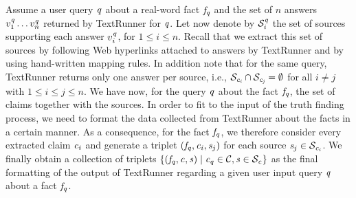 Assume a user query $\mathit{q}$ about a real-word fact $\mathit{f}_{\mathit{q}}$ and the set of $n$ answers $v_1^{\mathit{q}}\ldots v_n^{\mathit{q}}$
returned by TextRunner for $\mathit{q}$. Let now denote by $\mathcal{S}_{i}^{\mathit{q}}$ the set of sources supporting each answer $v_i^{\mathit{q}}$,
for $1\leq i\leq n$. Recall that we extract this set of sources by following Web hyperlinks attached to answers by TextRunner and by 
using hand-written mapping rules. In addition note that for the same query, TextRunner returns only one answer per source, i.e., $\mathcal{S}_{\mathit{c_{i}}}
\cap \mathcal{S}_{\mathit{c_{j}}}=\emptyset$ for all $i\neq j$ with $1\leq i\leq j\leq n$. We have now, for the query
$\mathit{q}$ about the fact $\mathit{f}_{\mathit{q}}$, the set of claims together with the sources. In order to fit to 
the input of the truth finding process, we need to format the data collected from TextRunner about the 
facts in a certain manner. As a consequence, for the fact $\mathit{f}_{\mathit{q}}$, we therefore consider every extracted 
claim $\mathit{c_{i}}$ and generate a triplet $(\mathit{f}_{\mathit{q}}, \mathit{c_{i}}, \mathit{s}_{j})$ for each source $\mathit{s}_{j}\in \mathcal{S}_{\mathit{c_{i}}}$.
We finally obtain a collection of triplets $\{(\mathit{f}_{\mathit{q}}, \mathit{c_{}}, \mathit{s}_{})\mid \mathit{c_{\mathit{q}}}\in \mathcal{C}, \mathit{s}_{} \in \mathcal{S}_{\mathit{c_{}}}\}$ 
as the final formatting of the output of TextRunner regarding a given user input query $\mathit{q}$ about a fact $\mathit{f}_{\mathit{q}}$. 




